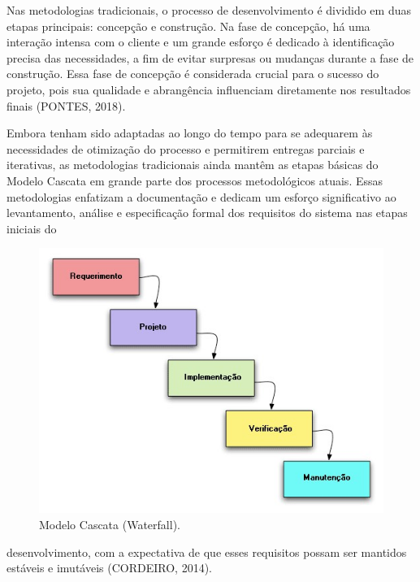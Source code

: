 Nas metodologias tradicionais, o processo de desenvolvimento é dividido em duas etapas principais: concepção e construção. Na fase de concepção, há uma interação intensa com o cliente e um grande esforço é dedicado à identificação precisa das necessidades, a fim de evitar surpresas ou mudanças durante a fase de construção. Essa fase de concepção é considerada crucial para o sucesso do projeto, pois sua qualidade e abrangência influenciam diretamente nos resultados finais (PONTES, 2018).

Embora tenham sido adaptadas ao longo do tempo para se adequarem às necessidades de otimização do processo e permitirem entregas parciais e iterativas, as metodologias tradicionais ainda mantêm as etapas básicas do Modelo Cascata em grande parte dos processos metodológicos atuais. Essas metodologias enfatizam a documentação e dedicam um esforço significativo ao levantamento, análise e especificação formal dos requisitos do sistema nas etapas iniciais do

\begin{figure}[htb]
	\caption{\label{fig:Fig_1}Modelo Cascata (Waterfall).}
	\begin{center}
		\includegraphics{figuras/Imagem1.jpg}
	\end{center}
\end{figure}

desenvolvimento, com a expectativa de que esses requisitos possam ser mantidos estáveis e imutáveis (CORDEIRO, 2014).

